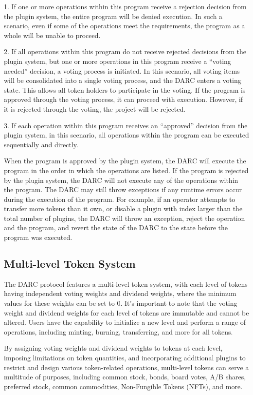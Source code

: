 \documentclass[main.tex]{subfiles}
\begin{document}
1. If one or more operations within this program receive a rejection decision from the plugin system, the entire program will be denied execution. In such a scenario, even if some of the operations meet the requirements, the program as a whole will be unable to proceed. 

2. If all operations within this program do not receive rejected decisions from the plugin system, but one or more operations in this program receive a ``voting needed'' decision, a voting process is initiated. In this scenario, all voting items will be consolidated into a single voting process, and the DARC enters a voting state. This allows all token holders to participate in the voting. If the program is approved through the voting process, it can proceed with execution. However, if it is rejected through the voting, the project will be rejected.

3. If each operation within this program receives an ``approved'' decision from the plugin system, in this scenario, all operations within the program can be executed sequentially and directly.

When the program is approved by the plugin system, the DARC will execute the program in the order in which the operations are listed. If the program is rejected by the plugin system, the DARC will not execute any of the operations within the program. The DARC may still throw exceptions if any runtime errors occur during the execution of the program. For example, if an operator attempts to transfer more tokens than it own, or disable a plugin with index larger than the total number of plugins, the DARC will throw an exception, reject the operation and the program, and revert the state of the DARC to the state before the program was executed.

\subsection{Multi-level Token System}

The DARC protocol features a multi-level token system, with each level of tokens having independent voting weights and dividend weights, where the minimum values for these weights can be set to 0. It's important to note that the voting weight and dividend weights for each level of tokens are immutable and cannot be altered. Users have the capability to initialize a new level and perform a range of operations, including minting, burning, transferring, and more for all tokens.

By assigning voting weights and dividend weights to tokens at each level, imposing limitations on token quantities, and incorporating additional plugins to restrict and design various token-related operations, multi-level tokens can serve a multitude of purposes, including common stock, bonds, board votes, A/B shares, preferred stock, common commodities, Non-Fungible Tokens (NFTs), and more.
\end{document}
